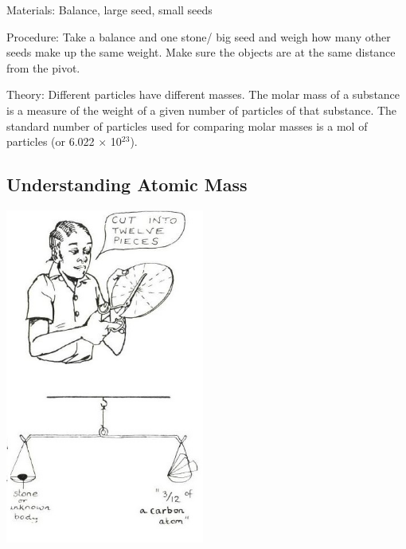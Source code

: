 \begin{multicols}{2}
\begin{description*}
\item[Materials:]{Balance, large seed, small seeds}
\item[Procedure:]{Take a balance and one stone/
big seed and weigh how
many other seeds make up the same weight. Make sure the objects are at the same distance
from the pivot.}
\item[Theory:]{Different particles have different masses. The molar mass of a substance is a measure of the weight of a given number of particles of that substance. The standard number of particles used for comparing molar masses is a mol of particles (or 6.022 $\times$ 10$^{23}$).}
\end{description*}

\columnbreak

\subsection{Understanding Atomic Mass}

\begin{center}
\includegraphics[width=0.49\textwidth]{./img/source/atomic-mass.jpg}
\end{center}


\end{multicols}
